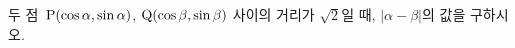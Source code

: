 두 점~$\mathrm{P}(\cos\alpha{,}\mkern3mu\mathopen{}\sin\alpha)$, $\mathrm{Q}(\cos\beta{,}\mkern3mu\mathopen{}\sin\beta)$ 사이의 거리가 $\sqrt{2}$일 때, $|\alpha-\beta|$의 값을 구하시오. 
